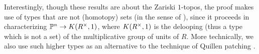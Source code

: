 Interestingly, though these results are
about the Zariski $1$-topos, the proof makes use of types that
are not (homotopy) sets (in the sense of \cite{hott}),
since it proceeds in characterizing $\mathbb{P}^n\rightarrow K(R^{\times},1)$, where $K(R^{\times},1)$ is the delooping
(thus a type which is not a set) of the multiplicative group of units of $R$.
More technically, we also use such higher types as an alternative to the technique
of Quillen patching \cite{Quillen,lombardi-quitte,Lam}.













